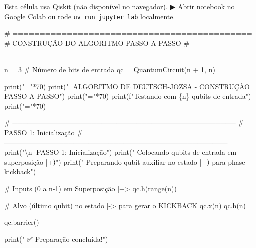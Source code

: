 \documentclass[
  brazilian,
]{report}
\newenvironment{Shaded}{\begin{snugshade}}{\end{snugshade}}
\newcommand{\BuiltInTok}[1]{\textcolor[rgb]{0.00,0.23,0.31}{#1}}
\newcommand{\CharTok}[1]{\textcolor[rgb]{0.13,0.47,0.30}{#1}}
\newcommand{\CommentTok}[1]{\textcolor[rgb]{0.37,0.37,0.37}{#1}}
\newcommand{\DecValTok}[1]{\textcolor[rgb]{0.68,0.00,0.00}{#1}}
\newcommand{\NormalTok}[1]{\textcolor[rgb]{0.00,0.23,0.31}{#1}}
\newcommand{\OperatorTok}[1]{\textcolor[rgb]{0.37,0.37,0.37}{#1}}
\newcommand{\SpecialCharTok}[1]{\textcolor[rgb]{0.37,0.37,0.37}{#1}}
\newcommand{\SpecialStringTok}[1]{\textcolor[rgb]{0.13,0.47,0.30}{#1}}
\newcommand{\StringTok}[1]{\textcolor[rgb]{0.13,0.47,0.30}{#1}}
\begin{document}
\begin{tcolorbox}[enhanced jigsaw, arc=.35mm, bottomrule=.15mm, bottomtitle=1mm, breakable, colback=white, colbacktitle=quarto-callout-warning-color!10!white, colframe=quarto-callout-warning-color-frame, coltitle=black, left=2mm, leftrule=.75mm, opacityback=0, opacitybacktitle=0.6, rightrule=.15mm, title=\textcolor{quarto-callout-warning-color}{\faExclamationTriangle}\hspace{0.5em}{⚛️ Célula Qiskit --- execute no Colab ou localmente}, titlerule=0mm, toprule=.15mm, toptitle=1mm]

Esta célula usa Qiskit (não disponível no navegador).
\href{https://colab.research.google.com/github/maxwellamaral/aula-quantum/blob/main/notebooks/05-interference.ipynb}{▶
Abrir notebook no Google Colab} ou rode \texttt{uv\ run\ jupyter\ lab}
localmente.

\begin{Shaded}
\begin{Highlighting}[]


\CommentTok{\# ============================================}
\CommentTok{\# CONSTRUÇÃO DO ALGORITMO PASSO A PASSO}
\CommentTok{\# ============================================}

\NormalTok{n }\OperatorTok{=} \DecValTok{3}  \CommentTok{\# Número de bits de entrada}
\NormalTok{qc }\OperatorTok{=}\NormalTok{ QuantumCircuit(n }\OperatorTok{+} \DecValTok{1}\NormalTok{, n)}

\BuiltInTok{print}\NormalTok{(}\StringTok{"="}\OperatorTok{*}\DecValTok{70}\NormalTok{)}
\BuiltInTok{print}\NormalTok{(}\StringTok{"🎯 ALGORITMO DE DEUTSCH{-}JOZSA {-} CONSTRUÇÃO PASSO A PASSO"}\NormalTok{)}
\BuiltInTok{print}\NormalTok{(}\StringTok{"="}\OperatorTok{*}\DecValTok{70}\NormalTok{)}
\BuiltInTok{print}\NormalTok{(}\SpecialStringTok{f"Testando com }\SpecialCharTok{\{}\NormalTok{n}\SpecialCharTok{\}}\SpecialStringTok{ qubits de entrada"}\NormalTok{)}
\BuiltInTok{print}\NormalTok{(}\StringTok{"="}\OperatorTok{*}\DecValTok{70}\NormalTok{)}

\CommentTok{\# ─────────────────────────────────────────────}
\CommentTok{\# PASSO 1: Inicialização}
\CommentTok{\# ─────────────────────────────────────────────}
\BuiltInTok{print}\NormalTok{(}\StringTok{"}\CharTok{\textbackslash{}n}\StringTok{📍 PASSO 1: Inicialização"}\NormalTok{)}
\BuiltInTok{print}\NormalTok{(}\StringTok{"   Colocando qubits de entrada em superposição |+⟩"}\NormalTok{)}
\BuiltInTok{print}\NormalTok{(}\StringTok{"   Preparando qubit auxiliar no estado |−⟩ para phase kickback"}\NormalTok{)}

\CommentTok{\# Inputs (0 a n{-}1) em Superposição |+\textgreater{}}
\NormalTok{qc.h(}\BuiltInTok{range}\NormalTok{(n))}

\CommentTok{\# Alvo (último qubit) no estado |{-}\textgreater{} para gerar o KICKBACK}
\NormalTok{qc.x(n)}
\NormalTok{qc.h(n)}

\NormalTok{qc.barrier()}

\BuiltInTok{print}\NormalTok{(}\StringTok{"   ✅ Preparação concluída!"}\NormalTok{)}
\end{Highlighting}
\end{Shaded}

\end{tcolorbox}
\end{document}
